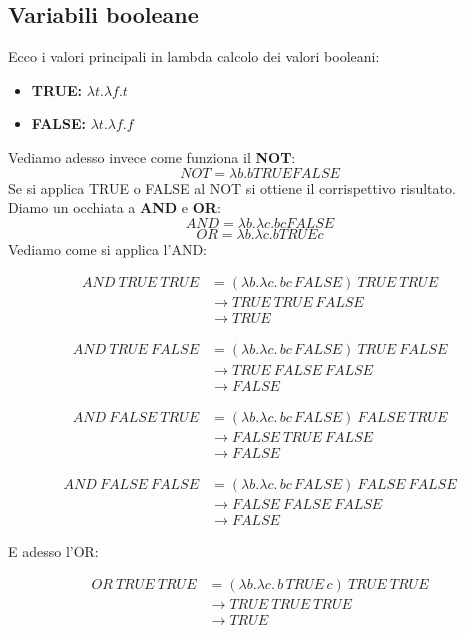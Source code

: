\documentclass[12pt,a4paper]{article}
\begin{document}
\subsection{Variabili booleane}
Ecco i valori principali in lambda calcolo dei valori booleani:
\begin{itemize}
  \item \textbf{TRUE:} $\lambda t.\lambda f.t$
  \item \textbf{FALSE:} $\lambda t.\lambda f.f$
\end{itemize}
Vediamo adesso invece come funziona il \textbf{NOT}:
\[
NOT = \lambda b.b TRUE FALSE
\]
Se si applica TRUE o FALSE al NOT si ottiene il corrispettivo risultato.\\
Diamo un occhiata a \textbf{AND} e \textbf{OR}:
\[
AND = \lambda b.\lambda c.bc FALSE
\]
\[
OR = \lambda b.\lambda c.b TRUE c
\]
Vediamo come si applica l'AND:

\[
\begin{aligned}
AND\ TRUE\ TRUE
&= (\lambda b.\lambda c.\,bc\,FALSE)\ TRUE\ TRUE\\
&\rightarrow TRUE\ TRUE\ FALSE\\
&\rightarrow TRUE
\end{aligned}
\]

\[
\begin{aligned}
AND\ TRUE\ FALSE
&= (\lambda b.\lambda c.\,bc\,FALSE)\ TRUE\ FALSE\\
&\rightarrow TRUE\ FALSE\ FALSE\\
&\rightarrow FALSE
\end{aligned}
\]

\[
\begin{aligned}
AND\ FALSE\ TRUE
&= (\lambda b.\lambda c.\,bc\,FALSE)\ FALSE\ TRUE\\
&\rightarrow FALSE\ TRUE\ FALSE\\
&\rightarrow FALSE
\end{aligned}
\]

\[
\begin{aligned}
AND\ FALSE\ FALSE
&= (\lambda b.\lambda c.\,bc\,FALSE)\ FALSE\ FALSE\\
&\rightarrow FALSE\ FALSE\ FALSE\\
&\rightarrow FALSE
\end{aligned}
\]

E adesso l'OR:

\[
\begin{aligned}
OR\ TRUE\ TRUE
&= (\lambda b.\lambda c.\,b\,TRUE\,c)\ TRUE\ TRUE\\
&\rightarrow TRUE\ TRUE\ TRUE\\
&\rightarrow TRUE
\end{aligned}
\]
\end{document}
